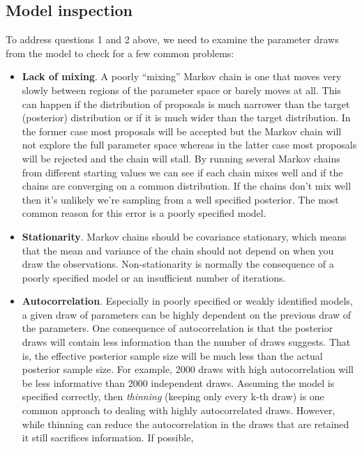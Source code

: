 \documentclass[]{book}
\providecommand{\tightlist}{%
  \setlength{\itemsep}{0pt}\setlength{\parskip}{0pt}}
\begin{document}
\subsection{Model inspection}\label{model-inspection}

To address questions 1 and 2 above, we need to examine the parameter
draws from the model to check for a few common problems:

\begin{itemize}
\tightlist
\item
  \textbf{Lack of mixing}. A poorly ``mixing'' Markov chain is one that
  moves very slowly between regions of the parameter space or barely
  moves at all. This can happen if the distribution of proposals is much
  narrower than the target (posterior) distribution or if it is much
  wider than the target distribution. In the former case most proposals
  will be accepted but the Markov chain will not explore the full
  parameter space whereas in the latter case most proposals will be
  rejected and the chain will stall. By running several Markov chains
  from different starting values we can see if each chain mixes well and
  if the chains are converging on a common distribution. If the chains
  don't mix well then it's unlikely we're sampling from a well specified
  posterior. The most common reason for this error is a poorly specified
  model.
\item
  \textbf{Stationarity}. Markov chains should be covariance stationary,
  which means that the mean and variance of the chain should not depend
  on when you draw the observations. Non-stationarity is normally the
  consequence of a poorly specified model or an insufficient number of
  iterations.
\item
  \textbf{Autocorrelation}. Especially in poorly specified or weakly
  identified models, a given draw of parameters can be highly dependent
  on the previous draw of the parameters. One consequence of
  autocorrelation is that the posterior draws will contain less
  information than the number of draws suggests. That is, the effective
  posterior sample size will be much less than the actual posterior
  sample size. For example, 2000 draws with high autocorrelation will be
  less informative than 2000 independent draws. Assuming the model is
  specified correctly, then \emph{thinning} (keeping only every k-th
  draw) is one common approach to dealing with highly autocorrelated
  draws. However, while thinning can reduce the autocorrelation in the
  draws that are retained it still sacrifices information. If possible,

\end{itemize}
\end{document}
